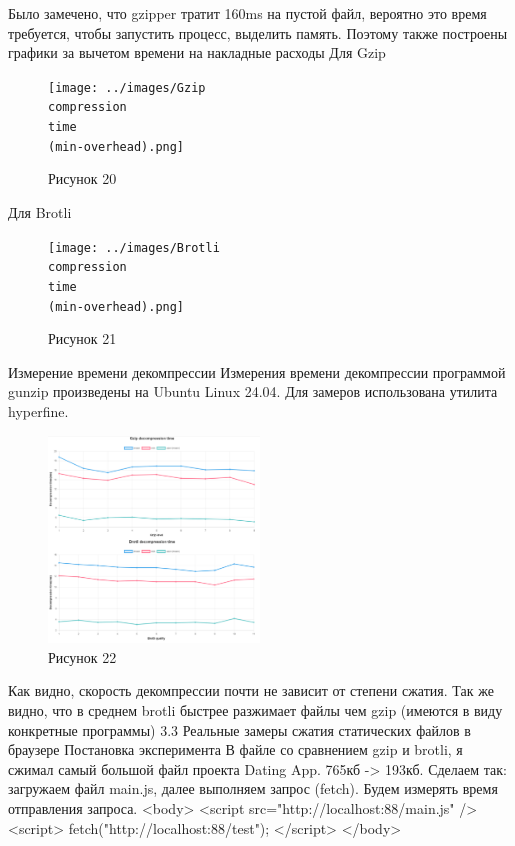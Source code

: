 \documentclass[12pt]{article}
\begin{document}
Было замечено, что gzipper тратит 160ms на пустой файл, вероятно это время требуется, чтобы запустить процесс, выделить память. Поэтому также построены графики за вычетом времени на накладные расходы
Для Gzip
\begin{figure}[h!]
\centering
\texttt{[image: ../images/Gzip\\ compression\\ time\\ (min-overhead).png]}
\caption{Рисунок 20}
\end{figure}

Для Brotli
\begin{figure}[h!]
\centering
\texttt{[image: ../images/Brotli\\ compression\\ time\\ (min-overhead).png]}
\caption{Рисунок 21}
\end{figure}

Измерение времени декомпрессии
Измерения времени декомпрессии программой gunzip произведены на Ubuntu Linux 24.04. Для замеров использована утилита hyperfine.
\begin{figure}[h!]
\centering
\includegraphics[width=0.5\textwidth]{../images/Decompression_time.png}
\caption{Рисунок 22}
\end{figure}

Как видно, скорость декомпрессии почти не зависит от степени сжатия.
Так же видно, что в среднем brotli быстрее разжимает файлы чем gzip (имеются в виду конкретные программы)
3.3 Реальные замеры сжатия статических файлов в браузере
Постановка эксперимента
В файле со сравнением gzip и brotli, я сжимал самый большой файл проекта Dating App. 765кб -> 193кб.
Сделаем так:
загружаем файл main.js, далее выполняем запрос (fetch). Будем измерять время отправления запроса.
  <body>
    <script src="http://localhost:88/main.js" />
    <script>
      fetch("http://localhost:88/test");
    </script>
  </body>
\end{document}
